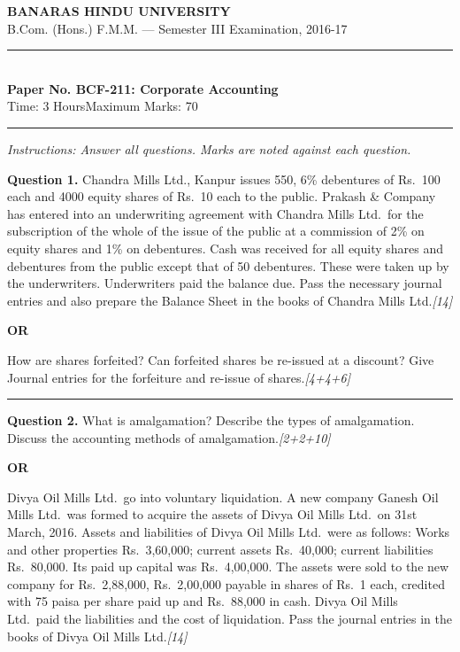 \documentclass[11pt,a4paper]{article}
\newcommand{\pts}[1]{\hfill   \textit{[#1]}}
\begin{document}
\begin{center}
  {\large\bfseries BANARAS HINDU UNIVERSITY}\\[2pt]
  {\normalsize B.Com. (Hons.) F.M.M. --- Semester III Examination, 2016-17}\\[6pt]
  \rule{0.8\linewidth}{0.5pt}\\[6pt]
  {\large\bfseries Paper No. BCF-211: Corporate Accounting}\\[4pt]
  {\normalsize Time: 3 Hours\hfill Maximum Marks: 70}
\end{center}

\rule{\linewidth}{0.4pt}

\smallskip



\noindent   \textit{Instructions: Answer all questions. Marks are noted against each question.}

\bigskip




\noindent   \textbf{Question 1.}
Chandra Mills Ltd., Kanpur issues 550, 6\% debentures of Rs.\ 100 each and 4000 equity shares of Rs.\ 10 each to the public. Prakash \& Company has entered into an underwriting agreement with Chandra Mills Ltd.\ for the subscription of the whole of the issue of the public at a commission of 2\% on equity shares and 1\% on debentures. Cash was received for all equity shares and debentures from the public except that of 50 debentures. These were taken up by the underwriters. Underwriters paid the balance due. Pass the necessary journal entries and also prepare the Balance Sheet in the books of Chandra Mills Ltd.\pts{14}

\centerline{   \textbf{OR}}

How are shares forfeited? Can forfeited shares be re-issued at a discount? Give Journal entries for the forfeiture and re-issue of shares.\pts{4+4+6}

\medskip\rule{\linewidth}{0.2pt}




\noindent   \textbf{Question 2.}
What is amalgamation? Describe the types of amalgamation. Discuss the accounting methods of amalgamation.\pts{2+2+10}

\centerline{   \textbf{OR}}

Divya Oil Mills Ltd.\ go into voluntary liquidation. A new company Ganesh Oil Mills Ltd.\ was formed to acquire the assets of Divya Oil Mills Ltd.\ on 31st March, 2016. Assets and liabilities of Divya Oil Mills Ltd.\ were as follows: Works and other properties Rs.\ 3,60,000; current assets Rs.\ 40,000; current liabilities Rs.\ 80,000. Its paid up capital was Rs.\ 4,00,000. The assets were sold to the new company for Rs.\ 2,88,000, Rs.\ 2,00,000 payable in shares of Rs.\ 1 each, credited with 75 paisa per share paid up and Rs.\ 88,000 in cash. Divya Oil Mills Ltd.\ paid the liabilities and the cost of liquidation. Pass the journal entries in the books of Divya Oil Mills Ltd.\pts{14}
\end{document}
